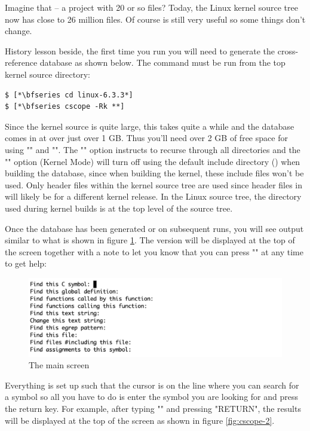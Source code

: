 \noindent
Imagine that -- a project with 20 or so files? Today, the Linux kernel source tree now has close to 26 million files. Of course  is still very useful so some things don't change.

History lesson beside, the first time you run  you will need to generate the cross-reference database as shown below. The command must be run from the top kernel source directory:

\begin{lstlisting}
$ [*\bfseries cd linux-6.3.3*]
$ [*\bfseries cscope -Rk **]
\end{lstlisting}

\noindent
Since the kernel source is quite large, this takes quite a while and the database comes in at over just over 1 GB. Thus you'll need over 2 GB of free space for using "" and "". The "" option instructs  to recurse through all directories and the "" option (Kernel Mode) will turn off using the default include directory () when building the database, since when building the kernel, these include files won't be used. Only header files within the kernel source tree are used since header files in  will likely be for a different kernel release. In the Linux source tree, the  directory used during kernel builds is at the top level of the source tree. 

Once the database has been generated or on subsequent runs, you will see output similar to what is shown in figure \ref{fig:cscope-1}. The  version will be displayed at the top of the screen together with a note to let you know that you can press "" at any time to get help:
 
 \begin{figure}[h]
	\centering
	\includegraphics[scale=0.6]{figures/cscope-1.png}
	\caption{The main  screen}
	\label{fig:cscope-1}
\end{figure}

Everything is set up such that the cursor is on the line where you can search for a symbol so all you have to do is enter the symbol you are looking for and press the return key. For example, after typing "" and pressing "RETURN", the results will be displayed at the top of the screen as shown in figure \ref{fig:cscope-2}.

